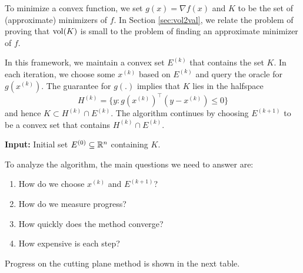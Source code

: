 \begin{rem*}
To minimize a convex function, we set $g(x)=\nabla f(x)$ and $K$
to be the set of (approximate) minimizers of $f$. In Section \ref{sec:vol2val},
we relate the problem of proving that $\mathrm{vol}(K)$ is small to the problem
of finding an approximate minimizer of $f$.
\end{rem*}
In this framework, we maintain a convex set $E^{(k)}$ that contains
the set $K$. In each iteration, we choose some $x^{(k)}$ based on
$E^{(k)}$ and query the oracle for $g(x^{(k)})$. The guarantee for
$g(.)$ implies that $K$ lies in the halfspace 
\[
H^{(k)}=\{y:g(x^{(k)})^{\top}(y-x^{(k)})\leq0\}
\]
 and hence $K\subset H^{(k)}\cap E^{(k)}.$ The algorithm continues
by choosing $E^{(k+1)}$ to be a convex set that contains $H^{(k)}\cap E^{(k)}$. 

\begin{algorithm2e}[H]

\caption{$\mathtt{CuttingPlaneFramework}$}\label{alg:cutting_plane}

\SetAlgoLined

\textbf{Input:} Initial set $E^{(0)}\subseteq\mathbb{R}^{n}$ containing $K$.


\end{algorithm2e}

To analyze the algorithm, the main questions we need to answer are:
\begin{enumerate}
\item How do we choose $x^{(k)}$ and $E^{(k+1)}$?
\item How do we measure progress?
\item How quickly does the method converge?
\item How expensive is each step?
\end{enumerate}
Progress on the cutting plane method is shown in the next table.

